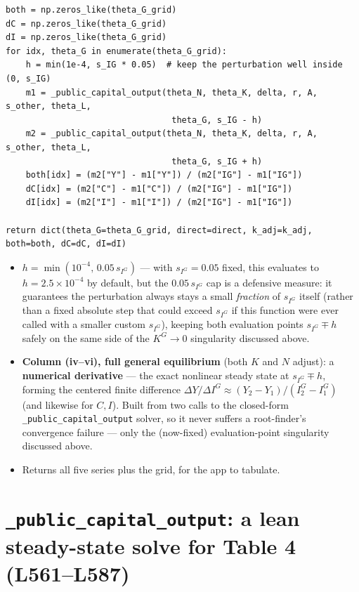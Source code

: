 \documentclass[11pt]{article}
\begin{document}
\begin{lstlisting}[firstnumber=545]
both = np.zeros_like(theta_G_grid)
dC = np.zeros_like(theta_G_grid)
dI = np.zeros_like(theta_G_grid)
for idx, theta_G in enumerate(theta_G_grid):
    h = min(1e-4, s_IG * 0.05)  # keep the perturbation well inside (0, s_IG)
    m1 = _public_capital_output(theta_N, theta_K, delta, r, A, s_other, theta_L,
                                 theta_G, s_IG - h)
    m2 = _public_capital_output(theta_N, theta_K, delta, r, A, s_other, theta_L,
                                 theta_G, s_IG + h)
    both[idx] = (m2["Y"] - m1["Y"]) / (m2["IG"] - m1["IG"])
    dC[idx] = (m2["C"] - m1["C"]) / (m2["IG"] - m1["IG"])
    dI[idx] = (m2["I"] - m1["I"]) / (m2["IG"] - m1["IG"])

return dict(theta_G=theta_G_grid, direct=direct, k_adj=k_adj, both=both, dC=dC, dI=dI)
\end{lstlisting}
\begin{itemize}
\item[\textbf{L549}] $h=\min(10^{-4},\,0.05\,s_{I^G})$ --- with
$s_{I^G}=0.05$ fixed, this evaluates to $h=2.5\times10^{-4}$ by default,
but the $0.05\,s_{I^G}$ cap is a defensive measure: it guarantees the
perturbation always stays a small \emph{fraction} of $s_{I^G}$ itself
(rather than a fixed absolute step that could exceed $s_{I^G}$ if this
function were ever called with a smaller custom $s_{I^G}$), keeping both
evaluation points $s_{I^G}\mp h$ safely on the same side of the
$K^G\to0$ singularity discussed above.
\item[\textbf{L550--L556}] \textbf{Column (iv--vi), full general
equilibrium} (both $K$ and $N$ adjust): a \textbf{numerical derivative} ---
the exact nonlinear steady state at $s_{I^G}\mp h$, forming the centered
finite difference $\Delta Y/\Delta I^G\approx(Y_2-Y_1)/(I^G_2-I^G_1)$ (and
likewise for $C,I$). Built from two calls to the closed-form
\texttt{\_public\_capital\_output} solver, so it never suffers a
root-finder's convergence failure --- only the (now-fixed) evaluation-point
singularity discussed above.
\item[\textbf{L558}] Returns all five series plus the grid, for the app to
tabulate.
\end{itemize}

\section{\texttt{\_public\_capital\_output}: a lean steady-state solve for Table 4 (L561--L587)}
\end{document}
